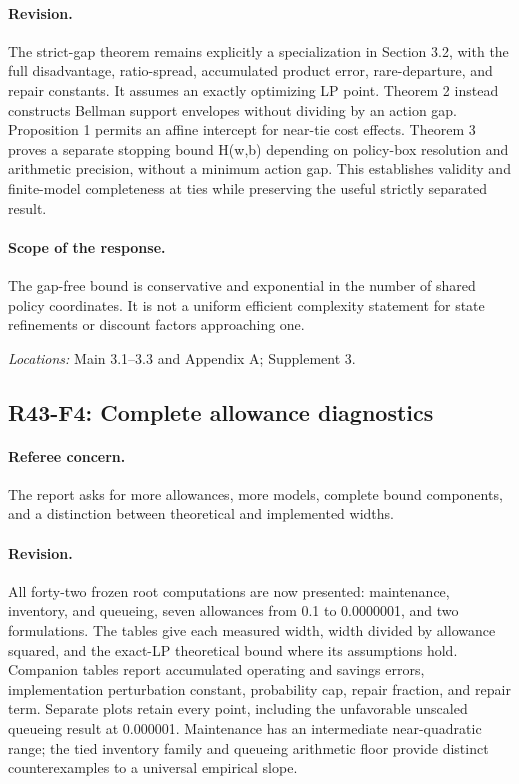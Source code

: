 \paragraph*{Revision.} The strict-gap theorem remains explicitly a specialization in Section 3.2, with the full disadvantage, ratio-spread, accumulated product error, rare-departure, and repair constants. It assumes an exactly optimizing LP point. Theorem 2 instead constructs Bellman support envelopes without dividing by an action gap. Proposition 1 permits an affine intercept for near-tie cost effects. Theorem 3 proves a separate stopping bound H(w,b) depending on policy-box resolution and arithmetic precision, without a minimum action gap. This establishes validity and finite-model completeness at ties while preserving the useful strictly separated result.

\paragraph*{Scope of the response.} The gap-free bound is conservative and exponential in the number of shared policy coordinates. It is not a uniform efficient complexity statement for state refinements or discount factors approaching one.

\noindent\textit{Locations:} Main 3.1--3.3 and Appendix A; Supplement 3.

\subsection{R43-F4: Complete allowance diagnostics}
\paragraph*{Referee concern.} The report asks for more allowances, more models, complete bound components, and a distinction between theoretical and implemented widths.

\paragraph*{Revision.} All forty-two frozen root computations are now presented: maintenance, inventory, and queueing, seven allowances from 0.1 to 0.0000001, and two formulations. The tables give each measured width, width divided by allowance squared, and the exact-LP theoretical bound where its assumptions hold. Companion tables report accumulated operating and savings errors, implementation perturbation constant, probability cap, repair fraction, and repair term. Separate plots retain every point, including the unfavorable unscaled queueing result at 0.000001. Maintenance has an intermediate near-quadratic range; the tied inventory family and queueing arithmetic floor provide distinct counterexamples to a universal empirical slope.

